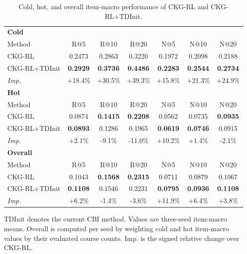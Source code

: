 \begin{table}[t]
\centering
\caption{Cold, hot, and overall item-macro performance of CKG-RL and CKG-RL+TDInit.}
\label{tab:tdinit_cold_hot_overall}
\begin{threeparttable}
\begin{tabular}{lcccccc}
\toprule
\multicolumn{7}{l}{\textbf{Cold}} \\
Method & R@5 & R@10 & R@20 & N@5 & N@10 & N@20 \\
\midrule
CKG-RL & 0.2473 & 0.2863 & 0.3220 & 0.1972 & 0.2098 & 0.2188 \\
CKG-RL+TDInit & \textbf{0.2929} & \textbf{0.3736} & \textbf{0.4486} & \textbf{0.2283} & \textbf{0.2544} & \textbf{0.2734} \\
\midrule
\textit{Imp.} & +18.4\% & +30.5\% & +39.3\% & +15.8\% & +21.3\% & +24.9\% \\
\midrule
\multicolumn{7}{l}{\textbf{Hot}} \\
Method & R@5 & R@10 & R@20 & N@5 & N@10 & N@20 \\
\midrule
CKG-RL & 0.0874 & \textbf{0.1415} & \textbf{0.2208} & 0.0562 & 0.0735 & \textbf{0.0935} \\
CKG-RL+TDInit & \textbf{0.0893} & 0.1286 & 0.1965 & \textbf{0.0619} & \textbf{0.0746} & 0.0915 \\
\midrule
\textit{Imp.} & +2.1\% & -9.1\% & -11.0\% & +10.2\% & +1.4\% & -2.1\% \\
\midrule
\multicolumn{7}{l}{\textbf{Overall}} \\
Method & R@5 & R@10 & R@20 & N@5 & N@10 & N@20 \\
\midrule
CKG-RL & 0.1043 & \textbf{0.1568} & \textbf{0.2315} & 0.0711 & 0.0879 & 0.1067 \\
CKG-RL+TDInit & \textbf{0.1108} & 0.1546 & 0.2231 & \textbf{0.0795} & \textbf{0.0936} & \textbf{0.1108} \\
\midrule
\textit{Imp.} & +6.2\% & -1.4\% & -3.6\% & +11.9\% & +6.4\% & +3.8\% \\
\bottomrule
\end{tabular}
\begin{tablenotes}[flushleft]\footnotesize
\item TDInit denotes the current CBI method. Values are three-seed item-macro means. Overall is computed per seed by weighting cold and hot item-macro values by their evaluated course counts. Imp. is the signed relative change over CKG-RL.
\end{tablenotes}
\end{threeparttable}
\end{table}
